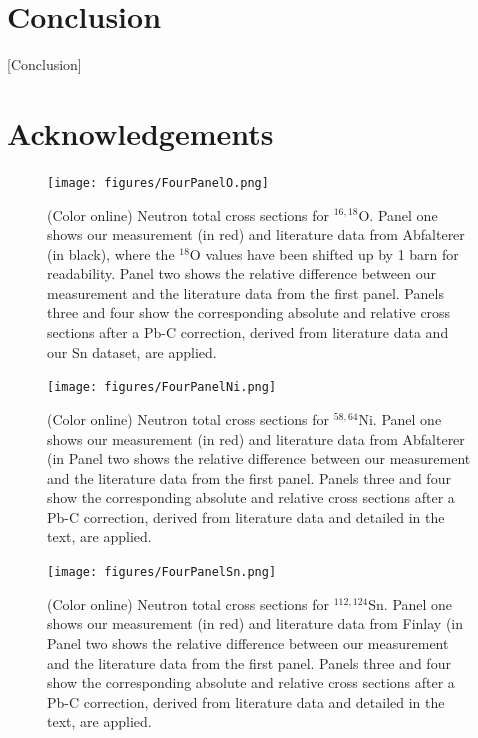\documentclass[twocolumn,secnumarabic,amssymb, nobibnotes, aps, prl,
superscriptaddress, nobalancelastpage]{revtex4}
\begin{document}
\section{Conclusion}

[Conclusion]

\section{Acknowledgements}

\begin{figure}
    \texttt{[image: figures/FourPanelO.png]}
    \caption{(Color online) Neutron total cross sections for $^{16,18}$O.
     Panel one shows our measurement (in red) and literature data from
     Abfalterer (in
     black), where the $^{18}$O values have been shifted up by 1 barn for
     readability. Panel two shows the relative difference between our 
     measurement and the literature data from the first panel. Panels three and
     four show the corresponding absolute and relative cross sections after a
     Pb-C correction, derived from literature data and our Sn dataset,
     are applied.
    }
\end{figure}

\begin{figure}
    \texttt{[image: figures/FourPanelNi.png]}
    \caption{(Color online) Neutron total cross sections for $^{58,64}$Ni.
     Panel one shows our measurement (in red) and literature data from
     Abfalterer (in %
     Panel two shows the relative difference between our 
     measurement and the literature data from the first panel. Panels three and
     four show the corresponding absolute and relative cross sections after a
     Pb-C correction, derived from literature data and detailed in the text,
     are applied.
    }
\end{figure}

\begin{figure}
    \texttt{[image: figures/FourPanelSn.png]}
    \caption{(Color online) Neutron total cross sections for $^{112,124}$Sn.
     Panel one shows our measurement (in red) and literature data from
     Finlay (in %
     Panel two shows the relative difference between our 
     measurement and the literature data from the first panel. Panels three and
     four show the corresponding absolute and relative cross sections after a
     Pb-C correction, derived from literature data and detailed in the text,
     are applied.
    }
\end{figure}
\end{document}
